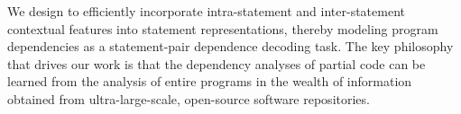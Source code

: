 We design {\tool} to efficiently incorporate intra-statement and
inter-statement contextual features into statement representations,
thereby modeling program dependencies as a statement-pair dependence
decoding task. The key philosophy that drives our work is that the
dependency analyses of partial code can be learned from the analysis
of entire programs in the wealth of information obtained from
ultra-large-scale, open-source software repositories.


